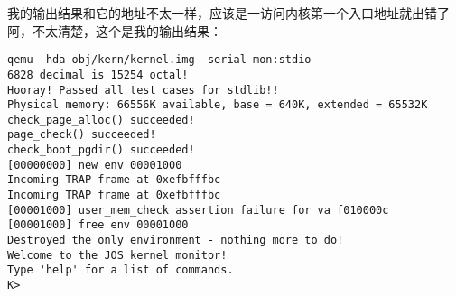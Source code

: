 \documentclass{article}
\begin{document}
\begin{CJK*}{UTF8}{gkai}
我的输出结果和它的地址不太一样，应该是一访问内核第一个入口地址就出错了阿，不太清楚，这个是我的输出结果：

\begin{lstlisting}[style=console]
qemu -hda obj/kern/kernel.img -serial mon:stdio
6828 decimal is 15254 octal!
Hooray! Passed all test cases for stdlib!!
Physical memory: 66556K available, base = 640K, extended = 65532K
check_page_alloc() succeeded!
page_check() succeeded!
check_boot_pgdir() succeeded!
[00000000] new env 00001000
Incoming TRAP frame at 0xefbfffbc
Incoming TRAP frame at 0xefbfffbc
[00001000] user_mem_check assertion failure for va f010000c
[00001000] free env 00001000
Destroyed the only environment - nothing more to do!
Welcome to the JOS kernel monitor!
Type 'help' for a list of commands.
K> 
\end{lstlisting}

\begin{lstlisting}[style=console]
\end{lstlisting}

\begin{lstlisting}[style=console]
\end{lstlisting}





\clearpage

\end{CJK*}
\end{document}
